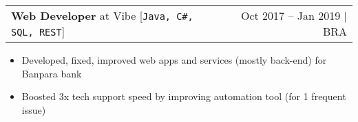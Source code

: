 \documentclass[a4paper,11pt]{article}
\makeatletter
\newcommand{\myHrefIcn}[2]{#2 \href{#1}{\scriptsize{\faExternalLink{}}}}
\newcommand{\resumeItemCustom}[1]{
  \item\small{#1 \vspace{-2pt}}
}
\newcommand{\resumeJobSubheadingD}[7]{
  \vspace{0pt}\item
    \begin{tabular*}{0.97\textwidth}{l@{\extracolsep{\fill}}r}
      \textbf{#4} at \myHrefIcn{#1}{#2} \hspace{3pt} [\small \texttt{#6}] & {\small #5}
    \end{tabular*}\vspace{-6pt}
}
\newcommand{\resumeItemListStart}{\begin{itemize}}
\newcommand{\resumeItemListEnd}{\end{itemize}\vspace{-5pt}}
\newcommand{\csharp}{C\#}
\makeatother
\begin{document}
    \resumeJobSubheadingD
      {http://www.vibetecnologia.com/}{Vibe}{Technology for businesses}%
      {Web Developer}{Oct 2017 -- Jan 2019 $\vert$ BRA}
      {Java, \csharp, SQL, REST}%
      {Internet banking web apps, management systems, web services for a state bank \myHrefIcn{http://www.banpara.b.br/}{Banpara}}
      \resumeItemListStart
        \resumeItemCustom{Developed, fixed, improved web apps and services (mostly back-end) for Banpara bank}
        \resumeItemCustom{Boosted 3x tech support speed by improving automation tool (for 1 frequent issue)}
      \resumeItemListEnd

\end{document}
